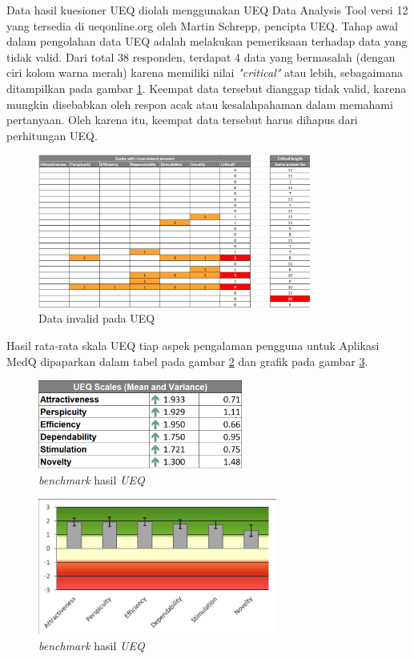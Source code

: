 Data hasil kuesioner UEQ diolah menggunakan UEQ Data Analysis Tool versi 12 yang tersedia di ueqonline.org oleh Martin Schrepp, pencipta UEQ. 
Tahap awal dalam pengolahan data UEQ adalah melakukan pemeriksaan terhadap data yang tidak valid. 
Dari total 38 responden, terdapat 4 data yang bermasalah (dengan ciri kolom warna merah) karena memiliki nilai \textit{"critical"} atau lebih, sebagaimana ditampilkan pada gambar \ref*{Fig:InvalidUEQ}. 
Keempat data tersebut dianggap tidak valid, karena mungkin disebabkan oleh respon acak atau kesalahpahaman dalam memahami pertanyaan. 
Oleh karena itu, keempat data tersebut harus dihapus dari perhitungan UEQ.
\begin{figure}[H]
	\centering
	\includegraphics[width=0.8\textwidth]{contents/chapter-4/images/invalidUEQ.png}
	\caption{Data invalid pada UEQ}
	\label{Fig:InvalidUEQ}
\end{figure}

Hasil rata-rata skala UEQ tiap aspek pengalaman pengguna untuk Aplikasi 
MedQ dipaparkan dalam tabel pada gambar \ref*{Fig : Tabel Skor UEQ} dan grafik pada gambar \ref*{Fig : Gambar Skor UEQ }.
\begin{figure}[H]
	\centering
	\includegraphics[width=0.6\textwidth]{contents/chapter-4/images/UEQScore.png}
	\caption{\textit{benchmark} hasil \textit{UEQ}}
	\label{Fig : Tabel Skor UEQ}
\end{figure}
\begin{figure}[H]
	\centering
	\includegraphics[width=0.7\textwidth]{contents/chapter-4/images/UEQScore-graph.png}
	\caption{\textit{benchmark} hasil \textit{UEQ}}
	\label{Fig : Gambar Skor UEQ }
\end{figure}

